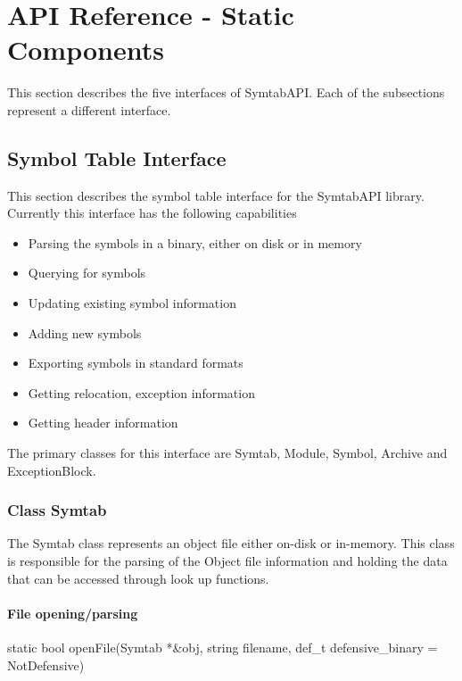 \section{API Reference - Static Components}
This section describes the five interfaces of SymtabAPI. Each of the subsections represent a different interface.

\subsection{Symbol Table Interface}
This section describes the symbol table interface for the SymtabAPI library. Currently this interface has the following capabilities
\begin{itemize}
    \item Parsing the symbols in a binary, either on disk or in memory 
    \item Querying for symbols 
    \item Updating existing symbol information
    \item Adding new symbols 
    \item Exporting symbols in standard formats
    \item Getting relocation, exception information
    \item Getting header information
\end{itemize}
The primary classes for this interface are Symtab, Module, Symbol, Archive and ExceptionBlock.

\subsubsection{Class Symtab}

The Symtab class represents an object file either on-disk or in-memory. This class is responsible for the parsing of the Object file information and holding the data that can be accessed through look up functions.

\paragraph{File opening/parsing}

\begin{apient}
static bool openFile(Symtab *&obj, string filename,
                    def_t defensive_binary = NotDefensive)
\end{apient}

